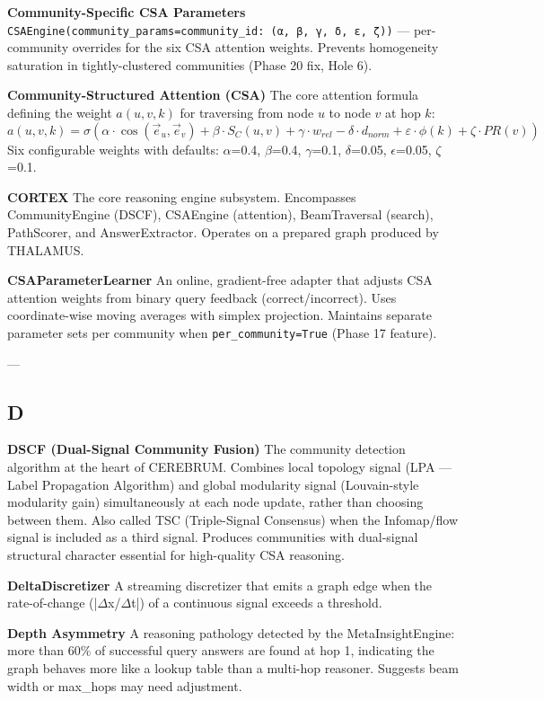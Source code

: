 \documentclass[11pt,article,oneside]{memoir}
\begin{document}
\textbf{Community-Specific CSA Parameters}
\texttt{CSAEngine(community\_params={community\_id: (α, β, γ, δ, ε, ζ)})} — per-community overrides for the six CSA attention weights. Prevents homogeneity saturation in tightly-clustered communities (Phase 20 fix, Hole 6).

\textbf{Community-Structured Attention (CSA)}
The core attention formula defining the weight $a(u,v,k)$ for traversing from node $u$ to node $v$ at hop $k$:
\begin{equation}
a(u,v,k) = \sigma(\alpha \cdot \cos(\vec{e}_u, \vec{e}_v) + \beta \cdot S_C(u,v) + \gamma \cdot w_{rel} - \delta \cdot d_{norm} + \varepsilon \cdot \phi(k) + \zeta \cdot PR(v))
\end{equation}
Six confi\-gurable weights with defaults: $\alpha$=0.4, $\beta$=0.4, $\gamma$=0.1, $\delta$=0.05, $\epsilon$=0.05, $\zeta$=0.1.

\textbf{CORTEX}
The core reasoning engine subsystem. Encompasses CommunityEngine (DSCF), CSAEngine (attention), BeamTraversal (search), PathScorer, and AnswerExtractor. Operates on a prepared graph produced by THALAMUS.

\textbf{CSAParameterLearner}
An online, gradient-free adapter that adjusts CSA attention weights from binary query feedback (correct/incorrect). Uses coordinate-wise moving averages with simplex projection. Maintains separate parameter sets per community when \texttt{per\_community=True} (Phase 17 feature).

---

\subsection{D}

\textbf{DSCF (Dual-Signal Community Fusion)}
The community detection algorithm at the heart of CEREBRUM. Combines local topology signal (LPA — Label Propagation Algorithm) and global modularity signal (Louvain-style modularity gain) simul\-taneously at each node update, rather than choosing between them. Also called TSC (Triple-Signal Consensus) when the Infomap/flow signal is included as a third signal. Produces communities with dual-signal structural character essential for high-quality CSA reasoning.

\textbf{DeltaDiscre\-tizer}
A streaming discretizer that emits a graph edge when the rate-of-change (|$\Delta$x/$\Delta$t|) of a continuous signal exceeds a threshold.

\textbf{Depth Asymmetry}
A reasoning pathology detected by the MetaInsightEngine: more than 60\% of successful query answers are found at hop 1, indicating the graph behaves more like a lookup table than a multi-hop reasoner. Suggests beam width or max\_hops may need adjustment.
\end{document}
